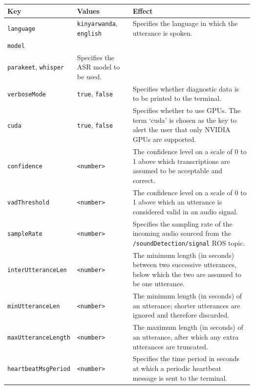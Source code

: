 \documentclass{CSSRforAfrica}
\begin{document}
{{\begin{center}
\begin{tabularx}{\linewidth}{| l | l | X|}
\hline 
{\small Key }                               & {\small Values }                                                 &  {\small Effect}       \\
\hline
{\footnotesize \verb+language+}  & {\footnotesize \verb+kinyarwanda+, \verb+english+}   &  {\small Specifies the language in which the utterance is spoken.} \\ 
\hline
{\footnotesize \verb+model+}  & {\footnotesize \makecell[l]{\verb+conformer-transducer+, \\ \verb+parakeet+, \verb+whisper+}} &  {\small Specifies the ASR model to be used.} \\ 
\hline
{\footnotesize \verb+verboseMode+}  & {\footnotesize \verb+true+, \verb+false+}     & {\small Specifies whether diagnostic data is to be printed to the terminal.} \\
\hline
{\footnotesize \verb+cuda+}  & {\footnotesize \verb+true+, \verb+false+}     & {\small Specifies whether to use GPUs. The term `cuda' is chosen as the key to alert the user that only NVIDIA GPUs are supported.} \\
\hline
{\footnotesize \verb+confidence+}  & {\footnotesize \verb+<number>+}     & {\small The confidence level on a scale of 0 to 1 above which transcriptions are assumed to be acceptable and correct.} \\
\hline
{\footnotesize \verb+vadThreshold+}  & {\footnotesize \verb+<number>+}     & {\small The confidence level on a scale of 0 to 1 above which an utterance is considered valid in an audio signal.} \\
\hline
{\footnotesize \verb+sampleRate+}  & {\footnotesize \verb+<number>+}     & {\small Specifies the sampling rate of the incoming audio sourced from the \verb+/soundDetection/signal+ ROS topic.} \\
\hline
{\footnotesize \verb+interUtteranceLen+}  & {\footnotesize \verb+<number>+}     & {\small The minimum length (in seconds) between two successive utterances, below which the two are assumed to be one utterance.} \\
\hline
{\footnotesize \verb+minUtteranceLen+}  & {\footnotesize \verb+<number>+}     & {\small The minimum length (in seconds) of an utterance; shorter utterances are ignored and therefore discarded.} \\
\hline
{\footnotesize \verb+maxUtteranceLength+}  & {\footnotesize \verb+<number>+}     & {\small The maximum length (in seconds) of an utterance, after which any extra utterances are truncated.} \\
\hline
{\footnotesize \verb+heartbeatMsgPeriod+}  & {\footnotesize \verb+<number>+}     & {\small Specifies the time period in seconds at which a periodic heartbeat message is sent to the terminal.} \\
\hline
\end{tabularx}
\end{center}


}}
\end{document}
